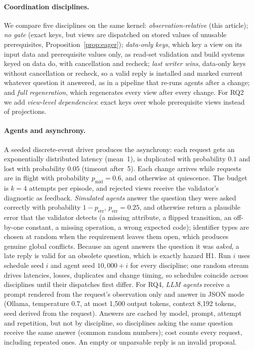 \documentclass[pdflatex,sn-mathphys-num]{sn-jnl}
\theoremstyle{thmstyleone}%
\theoremstyle{thmstyletwo}%
\theoremstyle{thmstylethree}%
\newcommand{\SimPerr}{0.25}
\newcommand{\SimBudget}{4}
\newcommand{\SimPmid}{0.6}
\begin{document}
\paragraph{Coordination disciplines.} We compare five disciplines on the same kernel: \emph{observation-relative} (this article); \emph{no gate} (exact keys, but views are dispatched on stored values of unusable prerequisites, Proposition~\ref{prop:eager}); \emph{data-only keys}, which key a view on its input data and prerequisite values only, as read-set validation and build systems keyed on data do, with cancellation and recheck; \emph{last writer wins}, data-only keys without cancellation or recheck, so a valid reply is installed and marked current whatever question it answered, as in a pipeline that re-runs agents after a change; and \emph{full regeneration}, which regenerates every view after every change. For RQ2 we add \emph{view-level dependencies}: exact keys over whole prerequisite views instead of projections.

\paragraph{Agents and asynchrony.} A seeded discrete-event driver produces the asynchrony: each request gets an exponentially distributed latency (mean~1), is duplicated with probability $0.1$ and lost with probability $0.05$ (timeout after~5). Each change arrives while requests are in flight with probability $p_{\mathrm{mid}}=\SimPmid$, and otherwise at quiescence. The budget is $k=\SimBudget$ attempts per episode, and rejected views receive the validator's diagnostic as feedback. \emph{Simulated agents} answer the question they were asked correctly with probability $1-p_{\mathrm{err}}$, $p_{\mathrm{err}}=\SimPerr$, and otherwise return a plausible error that the validator detects (a missing attribute, a flipped transition, an off-by-one constant, a missing operation, a wrong expected code); identifier types are chosen at random when the requirement leaves them open, which produces genuine global conflicts. Because an agent answers the question it was \emph{asked}, a late reply is valid for an obsolete question, which is exactly hazard H1. Run $i$ uses schedule seed $i$ and agent seed $10{,}000+i$ for every discipline; one random stream drives latencies, losses, duplicates and change timing, so schedules coincide across disciplines until their dispatches first differ. For RQ4, \emph{LLM agents} receive a prompt rendered from the request's observation only and answer in JSON mode (Ollama, temperature $0.7$, at most 1,500 output tokens, context 8,192 tokens, seed derived from the request). Answers are cached by model, prompt, attempt and repetition, but not by discipline, so disciplines asking the same question receive the same answer (common random numbers); cost counts every request, including repeated ones. An empty or unparsable reply is an invalid proposal.
\end{document}
